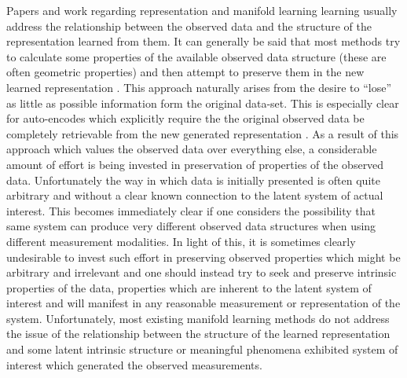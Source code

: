 	Papers and work regarding representation and manifold learning learning usually address the relationship between the observed data and the structure of the representation learned from them. It can generally be said that most methods try to calculate some properties of the available observed data structure (these are often geometric properties) and then attempt to preserve them in the new learned representation \cite{tenenbaum2000global, perraultriemannian, bengio2013representation, coifman2006diffusion, donoho2003hessian, kamada1989algorithm, roweis2000nonlinear, saul2003think, singer2008non, tipping1999probabilistic}. This approach naturally arises from the desire to “lose” as little as possible information form the original data-set. This is especially clear for auto-encodes which explicitly require the the original observed data be completely retrievable from the new generated representation \cite{vincent2008extracting, vincent2010stacked, hinton2006reducing}. As a result of this approach which values the observed data over everything else, a considerable amount of effort is being invested in preservation of properties of the observed data. Unfortunately the way in which data is initially presented is often quite arbitrary and without a clear known connection to the latent system of actual interest. This becomes immediately clear if one considers the possibility that same system can produce very different observed data structures when using different measurement modalities. In light of this, it is sometimes clearly undesirable to invest such effort in preserving observed properties which might be arbitrary and irrelevant and one should instead try to seek and preserve intrinsic properties of the data, properties which are inherent to the latent system of interest and will manifest in any reasonable measurement or representation of the system. Unfortunately, most existing manifold learning methods do not address the issue of the relationship between the structure of the learned representation and some latent intrinsic structure or meaningful phenomena exhibited system of interest which generated the observed measurements. 
		
